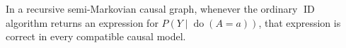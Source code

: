 In a recursive semi-Markovian causal graph, whenever the ordinary \(\operatorname{ID}\) algorithm returns an expression for \(P(Y\mid\operatorname{do}(A=a))\), that expression is correct in every compatible causal model.
